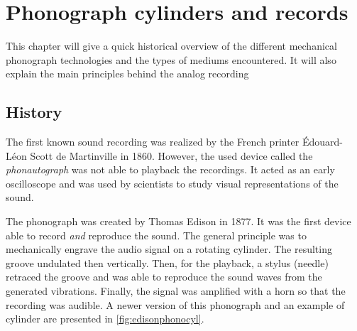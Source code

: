 
\chapter{Phonograph cylinders and records}

This chapter will give a quick historical overview of the different mechanical phonograph technologies and the types of mediums encountered. It will also explain the main principles behind the analog recording

\section{History}

The first known sound recording was realized by the French printer Édouard-Léon Scott de Martinville in 1860. However, the used device called the \emph{phonautograph} was not able to playback the recordings. It acted as an early oscilloscope and was used by scientists to study visual representations of the sound.

The phonograph was created by Thomas Edison in 1877. It was the first device able to record \emph{and} reproduce the sound. The general principle was to mechanically engrave the audio signal on a rotating cylinder. The resulting groove undulated then vertically. Then, for the playback, a stylus (needle) retraced the groove and was able to reproduce the sound waves from the generated vibrations. Finally, the signal was amplified with a horn so that the recording was audible. A newer version of this phonograph and an example of cylinder are presented in \autoref{fig:edisonphonocyl}.


